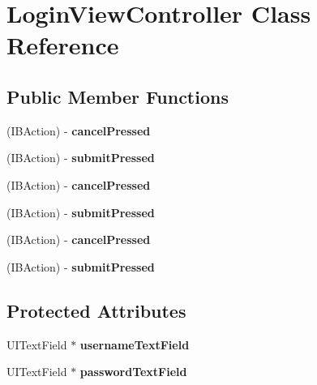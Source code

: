 \hypertarget{interface_login_view_controller}{
\section{LoginViewController Class Reference}
\label{interface_login_view_controller}
}
\subsection*{Public Member Functions}
\begin{DoxyCompactItemize}
\item 
\hypertarget{interface_login_view_controller_ae503630731197988635de685a8488567}{
(IBAction) -\/ {\bfseries cancelPressed}}
\label{interface_login_view_controller_ae503630731197988635de685a8488567}

\item 
\hypertarget{interface_login_view_controller_ad5af2ba239c1b5ccb34f6fa0ca7ee5bd}{
(IBAction) -\/ {\bfseries submitPressed}}
\label{interface_login_view_controller_ad5af2ba239c1b5ccb34f6fa0ca7ee5bd}

\item 
\hypertarget{interface_login_view_controller_ae503630731197988635de685a8488567}{
(IBAction) -\/ {\bfseries cancelPressed}}
\label{interface_login_view_controller_ae503630731197988635de685a8488567}

\item 
\hypertarget{interface_login_view_controller_ad5af2ba239c1b5ccb34f6fa0ca7ee5bd}{
(IBAction) -\/ {\bfseries submitPressed}}
\label{interface_login_view_controller_ad5af2ba239c1b5ccb34f6fa0ca7ee5bd}

\item 
\hypertarget{interface_login_view_controller_ae503630731197988635de685a8488567}{
(IBAction) -\/ {\bfseries cancelPressed}}
\label{interface_login_view_controller_ae503630731197988635de685a8488567}

\item 
\hypertarget{interface_login_view_controller_ad5af2ba239c1b5ccb34f6fa0ca7ee5bd}{
(IBAction) -\/ {\bfseries submitPressed}}
\label{interface_login_view_controller_ad5af2ba239c1b5ccb34f6fa0ca7ee5bd}

\end{DoxyCompactItemize}
\subsection*{Protected Attributes}
\begin{DoxyCompactItemize}
\item 
\hypertarget{interface_login_view_controller_ab9988b606b10367175ee27f8eacb0a93}{
UITextField $\ast$ {\bfseries usernameTextField}}
\label{interface_login_view_controller_ab9988b606b10367175ee27f8eacb0a93}

\item 
\hypertarget{interface_login_view_controller_ad61005cf165444363d870cb9fa10a592}{
UITextField $\ast$ {\bfseries passwordTextField}}
\label{interface_login_view_controller_ad61005cf165444363d870cb9fa10a592}

\end{DoxyCompactItemize}
